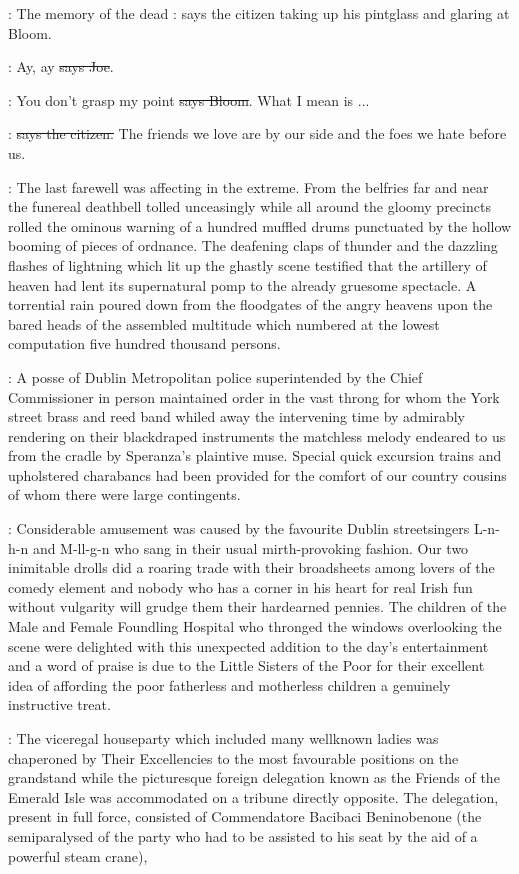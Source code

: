 \citizen:
The memory of the dead
\Nq:
says the citizen taking up his pintglass and
glaring at Bloom.

\joe:
Ay, ay \sout{says Joe}.

\Bloom:
You don't grasp my point \sout{says Bloom}.
What I mean is ...

\citizen:
 \sout{says the citizen.}
 The friends we love are
by our side and the foes we hate before us.

:
The last farewell was affecting in the extreme. From the belfries far
and near the funereal deathbell tolled unceasingly while all around the
gloomy precincts rolled the ominous warning of a hundred muffled drums
punctuated by the hollow booming of pieces of ordnance. The deafening
claps of thunder and the dazzling flashes of lightning which lit up the
ghastly scene testified that the artillery of heaven had lent its
supernatural pomp to the already gruesome spectacle. A torrential rain
poured down from the floodgates of the angry heavens upon the bared heads
of the assembled multitude which numbered at the lowest computation five
hundred thousand persons.

:
A posse of Dublin Metropolitan police
superintended by the Chief Commissioner in person maintained order in
the vast throng for whom the York street brass and reed band whiled away
the intervening time by admirably rendering on their blackdraped
instruments the matchless melody endeared to us from the cradle by
Speranza's plaintive muse. Special quick excursion trains and upholstered
charabancs had been provided for the comfort of our country cousins of
whom there were large contingents.

:
Considerable amusement was caused
by the favourite Dublin streetsingers L-n-h-n and M-ll-g-n who sang  in their usual mirth-provoking fashion.
Our two inimitable drolls did a roaring trade with their broadsheets among
lovers of the comedy element and nobody who has a corner in his heart for
real Irish fun without vulgarity will grudge them their hardearned
pennies. The children of the Male and Female Foundling Hospital who
thronged the windows overlooking the scene were delighted with this
unexpected addition to the day's entertainment and a word of praise is due
to the Little Sisters of the Poor for their excellent idea of affording
the poor fatherless and motherless children a genuinely instructive
treat.

:
The viceregal houseparty which included many wellknown ladies was
chaperoned by Their Excellencies to the most favourable positions on the
grandstand while the picturesque foreign delegation known as the Friends
of the Emerald Isle was accommodated on a tribune directly opposite.
The delegation, present in full force,
consisted of Commendatore Bacibaci Beninobenone (the semiparalysed
 of the party who had
to be assisted to his seat by the aid of a powerful steam crane),

